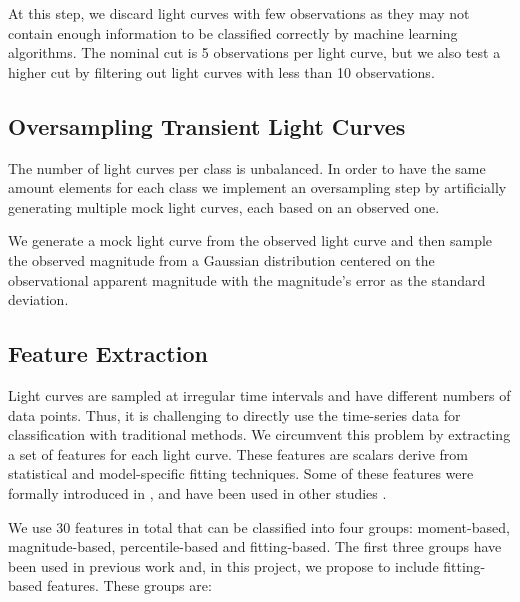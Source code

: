 \documentclass[a4paper,fleqn,usenatbib]{mnras}
\begin{document}
At this step, we discard light curves with few observations as they may not contain
enough information to be classified correctly by machine learning
algorithms.  
The nominal cut is 5 observations per light curve, but we also test a
higher cut by filtering out light curves with less than 10 observations.

\subsection{Oversampling Transient Light Curves} \label{subsection_oversampling}

The number of light curves per class is unbalanced. 
In order to have the same amount elements for each class we implement an
oversampling step by artificially generating multiple mock light curves,
each based on an observed one. 

We generate a mock light curve from the observed light curve and 
then sample the observed magnitude from a Gaussian distribution
centered on the observational apparent magnitude with the magnitude's
error as the  standard deviation. 


\subsection{Feature Extraction} \label{subsection_extraction}

Light curves are sampled at irregular time intervals and have
different numbers of data points.
Thus, it is challenging to directly use the time-series data for
classification with traditional methods.
We circumvent this problem by extracting a set of features for each
light curve.
These features are scalars derive from statistical and model-specific
fitting techniques.
Some of these features were formally introduced in
\cite{1101.1959}, and have been used in other studies
\citep{1603.00882,1601.03931}.  

We use 30 features in total that can be classified into four groups:
moment-based, magnitude-based, percentile-based and fitting-based. 
The first three groups have been used in previous work and, in this project, we propose to include fitting-based features.
These groups are:
\end{document}
